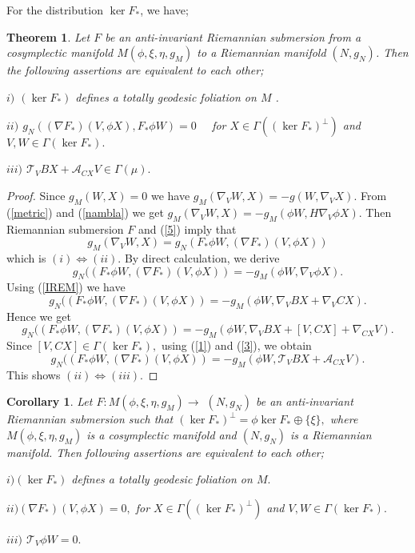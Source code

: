 \documentclass{amsart}
\newtheorem{theorem}{Theorem}
\theoremstyle{plain}
\newtheorem{corollary}{Corollary}
\numberwithin{equation}{section}
\begin{document}
For the distribution $\ker F_{\ast }$, we have;

\begin{theorem}
Let $F$ be an anti-invariant Riemannian submersion from a cosymplectic
manifold $M(\phi ,\xi ,\eta ,g_{M})$ to a Riemannian manifold $(N,g_{N})$.
Then the following assertions are equivalent to each other;

$i)$ $(\ker F_{\ast })$ defines a totally geodesic foliation on $M$ .

$ii)$ $g_{N}((\nabla F_{\ast })(V,\phi X),F_{\ast }\phi W)=0$ \ \ for $X\in
\Gamma ((\ker F_{\ast })^{\bot })$ and $V,W\in \Gamma (\ker F_{\ast }).$

$iii)$ $\mathcal{T}_{V}BX+\mathcal{A}_{CX}V\in \Gamma (\mu ).$
\end{theorem}

\begin{proof}
Since $g_{M}(W,X)=0$ we have $g_{M}(\nabla _{V}W,X)=-g(W,\nabla _{V}X).$
From (\ref{metric}) and (\ref{nambla}) we get $g_{M}(\nabla
_{V}W,X)=-g_{M}(\phi W,H\nabla _{V}\phi X).$ Then Riemannian submersion $F$
and (\ref{5}) imply that 
\begin{equation*}
g_{M}(\nabla _{V}W,X)=g_{N}(F_{\ast }\phi W,(\nabla F_{\ast })(V,\phi X))
\end{equation*}which is $(i)\Leftrightarrow (ii).$ By direct calculation, we derive\begin{equation*}
g_{N}((F_{\ast }\phi W,(\nabla F_{\ast })(V,\phi X))=-g_{M}(\phi W,\nabla
_{V}\phi X).
\end{equation*}Using (\ref{IREM}) we have 
\begin{equation*}
g_{N}((F_{\ast }\phi W,(\nabla F_{\ast })(V,\phi X))=-g_{M}(\phi W,\nabla
_{V}BX+\nabla _{V}CX).
\end{equation*}Hence we get\begin{equation*}
g_{N}((F_{\ast }\phi W,(\nabla F_{\ast })(V,\phi X))=-g_{M}(\phi W,\nabla
_{V}BX+\left[ V,CX\right] +\nabla _{CX}V).
\end{equation*}Since $\left[ V,CX\right] \in \Gamma (\ker F_{\ast }),$ using (\ref{1}) and (\ref{3}), we obtain\begin{equation*}
g_{N}((F_{\ast }\phi W,(\nabla F_{\ast })(V,\phi X))=-g_{M}(\phi W,\mathcal{T}_{V}BX+\mathcal{A}_{CX}V).
\end{equation*}This shows $(ii)\Leftrightarrow (iii).$
\end{proof}

\begin{corollary}
Let $F:M(\phi ,\xi ,\eta ,g_{M})\rightarrow $ $(N,g_{N})$ be an
anti-invariant Riemannian submersion such that $(\ker F_{\ast })^{\bot
}=\phi \ker F_{\ast }\oplus \{\xi \},$ where $M(\phi ,\xi ,\eta ,g_{M})$ is
a cosymplectic manifold and $(N,g_{N})$ is a Riemannian manifold. Then
following assertions are equivalent to each other;

$i)(\ker F_{\ast })$ \textit{defines a totally geodesic foliation on }$M.$

$ii)(\nabla F_{\ast })(V,\phi X)=0,$ for $X\in \Gamma ((\ker F_{\ast
})^{\bot })$ and $V,W\in \Gamma (\ker F_{\ast }).$

$iii)$ $\mathcal{T}_{V}\phi W=0.$
\end{corollary}
\end{document}

